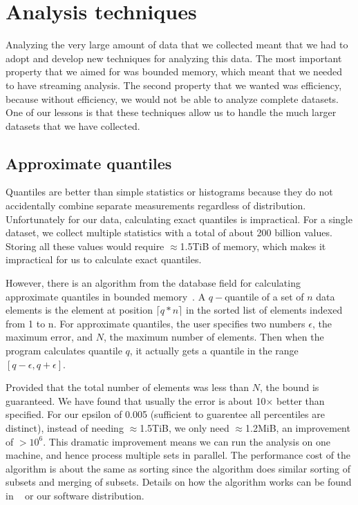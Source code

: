\section{Analysis techniques}
\label{sec:analysis-techniques}

Analyzing the very large amount of data that we collected meant that
we had to adopt and develop new techniques for analyzing this data.
The most important property that we aimed for was bounded memory,
which meant that we needed to have streaming analysis.  The second
property that we wanted was efficiency, because without efficiency, we
would not be able to analyze complete datasets.  One of our lessons is
that these techniques allow us to handle the much larger datasets that
we have collected.

\subsection{Approximate quantiles}


Quantiles are better than simple statistics or histograms because they
do not accidentally combine separate measurements regardless of
distribution.  Unfortunately for our data, calculating exact quantiles
is impractical.  For a single dataset, we collect multiple statistics
with a total of about 200 billion values.  Storing all these values
would require $\approx$1.5TiB of memory, which makes it impractical
for us to calculate exact quantiles.

However, there is an algorithm from the database field for calculating
approximate quantiles in bounded
memory~\cite{Manku98approximatemedians}.  A $q-$quantile of a set of
$n$ data elements is the element at position $\lceil q*n\rceil$ in the
sorted list of elements indexed from 1 to n.  For approximate
quantiles, the user specifies two numbers $\epsilon$, the maximum
error, and $N$, the maximum number of elements.  Then when the program
calculates quantile $q$, it actually gets a quantile in the range
$[q-\epsilon,q+\epsilon]$.  

Provided that the total number of elements
was less than $N$, the bound is guaranteed.  We have found that
usually the error is about 10$\times$ better than specified.  For our
epsilon of 0.005 (sufficient to guarentee all percentiles are
distinct), instead of needing $\approx$1.5TiB, we only need
$\approx$1.2MiB, an improvement of $>10^6$.  This dramatic improvement
means we can run the analysis on one machine, and hence process
multiple sets in parallel.  The performance cost of the algorithm is
about the same as sorting since the algorithm does similar sorting of
subsets and merging of subsets.  Details on how the algorithm works
can be found in ~\cite{Manku98approximatemedians} or our software
distribution.

